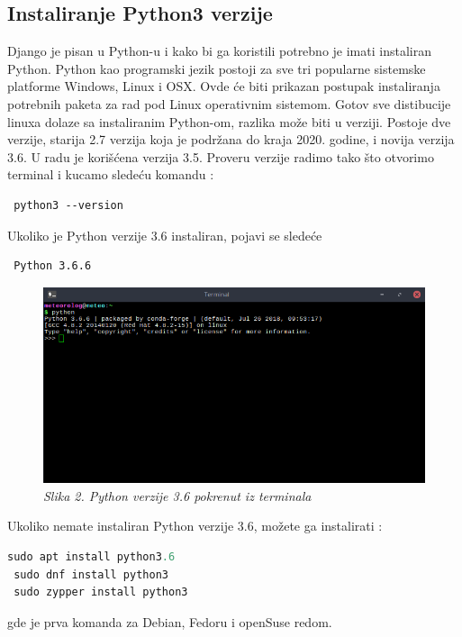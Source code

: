 \documentclass[12pt]{article}
\begin{document}
\subsection{Instaliranje Python3 verzije }
Django je pisan u Python-u i kako bi ga koristili potrebno je imati instaliran Python. Python kao programski jezik postoji za sve tri popularne sistemske platforme Windows, Linux i OSX. Ovde će biti prikazan postupak instaliranja potrebnih paketa za rad pod Linux operativnim sistemom. Gotov sve distibucije linuxa dolaze sa instaliranim Python-om, razlika može biti u verziji. Postoje dve verzije, starija 2.7 verzija koja je podržana do kraja 2020. godine, i novija verzija 3.6. U radu je korišćena verzija 3.5. Proveru verzije radimo tako što otvorimo terminal i kucamo sledeću komandu : 
\begin{lstlisting}
 python3 --version
\end{lstlisting}
Ukoliko je Python verzije 3.6 instaliran, pojavi se sledeće
\begin{lstlisting}
 Python 3.6.6
\end{lstlisting}
\begin{figure}[h!]
\centering
\includegraphics[width=1.\linewidth]{python.png}
\caption*{\textsl{Slika 2. Python verzije 3.6 pokrenut iz terminala}}
\end{figure}
Ukoliko nemate instaliran Python verzije 3.6, možete ga instalirati :
\begin{lstlisting}[language=Python]
 sudo apt install python3.6
 sudo dnf install python3
 sudo zypper install python3
\end{lstlisting}
gde je prva komanda za Debian, Fedoru i openSuse redom.
\end{document}
